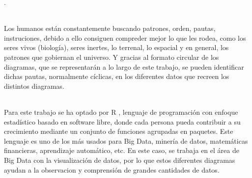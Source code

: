 \documentclass{article}\usepackage[]{graphicx}\usepackage[]{color}
\begin{document}
.~\\~\par
Los humanos est\'an constantemente buscando patrones, orden, pautas, instruciones, debido a ello consiguen compreder mejor lo que les rodea, como los seres vivos (biolog\'ia), seres inertes, lo terrenal, lo espacial y en general, los patrones que gobiernan el universo. Y gracias al formato circular de los diagramas, que se representar\'an a lo largo de este trabajo, se pueden identificar dichas pautas, normalmente c\'iclicas, en los diferentes datos que recreen los distintos diagramas.~\\~\par
Para este trabajo se ha optado por R\cite{R}
, lenguaje de programaci\'on con enfoque estad\'istico basado en software libre, donde cada persona pueda contribuir a su crecimiento mediante un conjunto de funciones agrupadas en paquetes. Este lenguaje es uno de los m\'as usados para Big Data, miner\'ia de datos, matem\'aticas financieras, aprendizaje autom\'atico, etc. En este caso, se trabaja en el \'area de Big Data con la visualizaci\'on de datos, por lo que estos diferentes diagramas ayudan a la observacion y comprensi\'on de grandes cantidades de datos.
\clearpage
\end{document}
